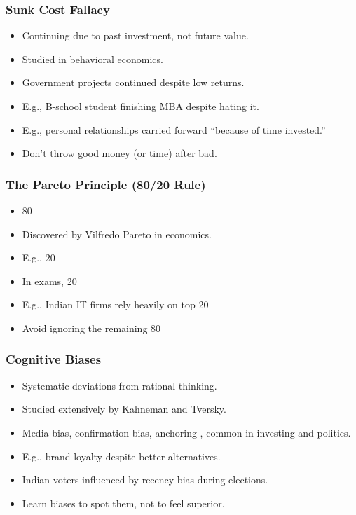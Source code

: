\begin{frame}[fragile]\frametitle{Sunk Cost Fallacy}
  \begin{itemize}
    \item Continuing due to past investment, not future value.
    \item Studied in behavioral economics.
    \item Government projects continued despite low returns.
    \item E.g., B-school student finishing MBA despite hating it.
    \item E.g., personal relationships carried forward ``because of time invested.''
    \item Don't throw good money (or time) after bad.
  \end{itemize}
\end{frame}

\begin{frame}[fragile]\frametitle{The Pareto Principle (80/20 Rule)}
  \begin{itemize}
    \item 80%
    \item Discovered by Vilfredo Pareto in economics.
    \item E.g., 20%
    \item In exams, 20%
    \item E.g., Indian IT firms rely heavily on top 20%
    \item Avoid ignoring the remaining 80%
  \end{itemize}
\end{frame}

\begin{frame}[fragile]\frametitle{Cognitive Biases}
  \begin{itemize}
    \item Systematic deviations from rational thinking.
    \item Studied extensively by Kahneman and Tversky.
    \item Media bias, confirmation bias, anchoring , common in investing and politics.
    \item E.g., brand loyalty despite better alternatives.
    \item Indian voters influenced by recency bias during elections.
    \item Learn biases to spot them, not to feel superior.
  \end{itemize}
\end{frame}

